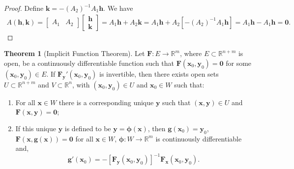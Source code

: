 \documentclass{article}
\newcommand{\R}{\mathbb{R}}
\newcommand{\x}{\mathbf{x}}
\newcommand{\y}{\mathbf{y}}
\newcommand{\h}{\mathbf{h}}
\newcommand{\g}{\mathbf{g}}
\newcommand{\ze}{\mathbf{0}}
\theoremstyle{definition}
\newtheorem{theorem}{Theorem}[section]
\begin{document}
	\begin{proof}
		Define $ \mathbf k = -(A_2)^{-1}A_1 \h$. We have 
		\begin{align*}
			A(\h,\mathbf k) = \begin{bmatrix}A_1&A_2\end{bmatrix}\begin{bmatrix}
				\mathbf h\\ \mathbf k
			\end{bmatrix} = A_1\h + A_2\mathbf k = A_1\h + A_2[-(A_2)^{-1}A_1 \h] = A_1\h - A_1\h = \ze.
		\end{align*} 
	\end{proof}
	\begin{theorem}[Implicit Function Theorem]
		Let $ \mathbf F:E\to \R^{m} $, where $ E\subset  \R^{n+m}$ is open, be a continuously differentiable function such that $ \mathbf F(\x_0,\y_0) =\ze $ for some $ (\x_0,\y_0)\in E $. If $ \mathbf F_\y'(\x_0,\y_0) $ is invertible, then there exists open sets $ U\subset \R^{n+m} $ and $ V\subset \R^n $, with $ (\x_0,\y_0)\in U $ and $ \x_0\in W $ such that:
		\begin{enumerate}
			\item For all $ \x\in W $ there is a corresponding unique $ \y $ such that $ (\x,\y)\in U $ and $ \mathbf F(\x,\y) = \ze $;
			\item If this unique $ \y $ is defined to be $ \y = \boldsymbol{\phi}(\x) $, then $ \g(\x_0)=\y_0 $, $ \mathbf F(\x,\g(\x))=\ze $ for all $ \x\in W $,  $ \boldsymbol{\phi}:W\to\R^m $ is continuously differentiable and,
			$$ \g'(\x_0) = -[\mathbf F_\y(\x_0,\y_0)]^{-1}\mathbf F_\x(\x_0,\y_0).$$ 
		\end{enumerate} 
	\end{theorem}
\end{document}

